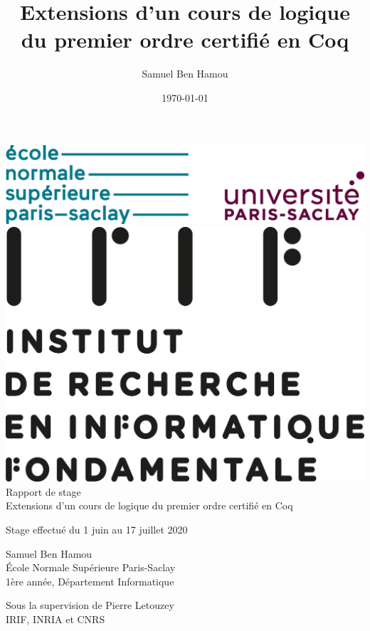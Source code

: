 \documentclass[a4paper]{article}
\title{Extensions d'un cours de logique du premier ordre certifié en Coq}
\author{Samuel Ben Hamou}
\date{\today}
\theoremstyle{remark}
\theoremstyle{remark}
\theoremstyle{remark}
\theoremstyle{definition}
\theoremstyle{definition}
\theoremstyle{definition}
\begin{document}
\begin{center}
	\vspace*{2em}
	\includegraphics[scale=0.45]{logo_ens.png} \hspace*{1cm} \includegraphics[scale=0.1]{logo-irif.png} \\
    \vspace*{6em}
    {\LARGE Rapport de stage} \\ \vspace{2em}
    {\huge Extensions d'un cours de logique du premier ordre certifié en Coq} \\ \vspace{4em}
    
    {\Large Stage effectué du 1 juin au 17 juillet 2020} \\ \vspace{6em}
    
    {\Large Samuel Ben Hamou} \\ \smallskip
    {\large \'Ecole Normale Supérieure Paris-Saclay} \\ 
    {\large 1ère année, Département Informatique} \\ \vspace{4em}
    
    {\Large Sous la supervision de Pierre Letouzey} \\ \smallskip
    {\large IRIF, INRIA et CNRS} \vspace{4em}
\end{center}
\end{document}
